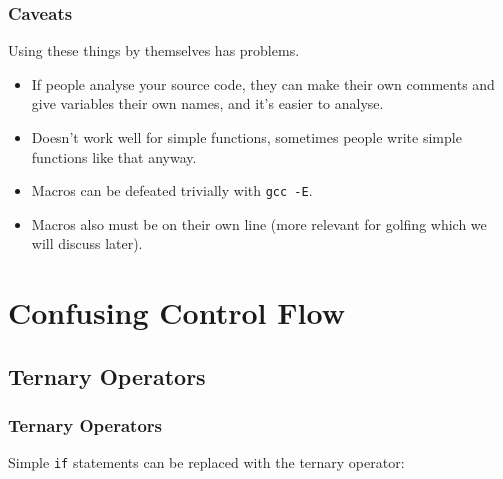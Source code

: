 \documentclass[handout,xcolor]{beamer}
\begin{document}
\begin{frame}
	\frametitle{Caveats}
	\pause
	
	Using these things by themselves has problems.
	\pause
	
	\begin{itemize}
		\item If people analyse your source code, they can make their own comments and give variables their own names, and it's easier to analyse.
		\pause
		\item Doesn't work well for simple functions, sometimes people write simple functions like that anyway.
		\pause
		\item Macros can be defeated trivially with \texttt{gcc -E}.
		\pause
		\item Macros also must be on their own line (more relevant for golfing which we will discuss later).
	\end{itemize}
\end{frame}

\section{Confusing Control Flow}

\subsection{Ternary Operators}

\begin{frame}
	\frametitle{Ternary Operators}
	\pause
	
	Simple \texttt{if} statements can be replaced with the ternary operator:
	\pause
	
	\begin{columns}
		\begin{column}{0.45\textwidth}
			\centering
			
		\end{column}
		\pause
		\begin{column}{0.45\textwidth}
			\centering
			
		\end{column}
	\end{columns}
\end{frame}
\end{document}
